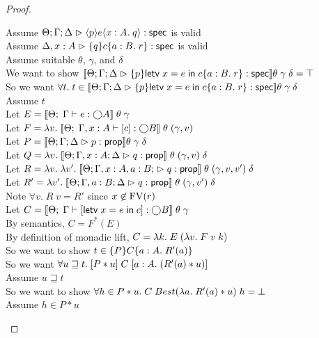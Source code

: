 \begin{proof}
  \begin{tabbedproof}
    \oo Assume $\judgeS{\mspec{p}{e}{x:A}{q}}$ is valid \\
    \oo Assume $\judgeS[\Delta,x:A]{\spec{q}{c}{a:B}{r}}$ is valid\\
    \ooo Assume suitable $\theta$, $\gamma$, and $\delta$ \\
    \oooo We want to show $\interp{\judgeS{\spec{p}{\letv{x}{e}{c}}{a:B}{r}}}\theta\;\gamma\;\delta = \top$\\
    \oooo So we want $\forall t.\; t \in \interp{\judgeS{\spec{p}{\letv{x}{e}{c}}{a:B}{r}}}\theta\;\gamma\;\delta$ \\
    \oooo Assume $t$ \\
    \ooooo Let $E = \interp{\judgeE{\Gamma}{e}{\monad{A}}}\;\theta\;\gamma$ \\
    \ooooo Let $F = \semfun{v}{\interp{\judgeE{\Gamma,x:A}{\comp{c}}{\monad{B}}}\;\theta\;(\gamma,v)}$ \\
    \ooooo Let $P = \interp{\judgeA{p}{\assert}}\theta\;\gamma\;\delta$ \\
    \ooooo Let $Q = \semfun{v}{\interp{\judgeA[\Theta; \Gamma ,x:A;\Delta]{q}{\assert}}\;\theta\;(\gamma,v)\;\delta}$ \\
    \ooooo Let $R = \semfun{v}{\semfun{v'}{\interp{\judgeA[\Theta;\Gamma,x:A,a:B;]{q}{\assert}}\;\theta\;(\gamma, v, v')\;\delta}}$ \\
    \ooooo Let $R' = \semfun{v'}{\interp{\judgeA[\Theta; \Gamma, a:B; \Delta]{q}{\assert}}\;\theta\;(\gamma, v')\;\delta}$ \\
    \ooooo Note $\forall v.\; R\;v = R'$ since $x \not\in \FV{r}$ \\
    \ooooo Let $C = \interp{\judgeE{\Gamma}{\comp{\letv{x}{e}{c}}}{\monad{B}}}\;\theta\;\gamma$ \\
    \ooooo By semantics, $C = F^*(E)$ \\
    \ooooo By definition of monadic lift, $C = \semfun{k}{E\;(\semfun{v}{F\;v\;k})}$ \\
    \ooooo So we want to show $t \in \spec{P}{C}{a:A}{R'(a)}$ \\
    \ooooo So we want $\forall u \sqsupseteq t.\; \basicspec{P * u}{C}{a:A}{(R'(a) * u)}$ \\
    \ooooo Assume $u \sqsupseteq t$ \\
    \oooooo So we want to show $\forall h \in P * u.\; C\;Best(\semfun{a}{R'(a) * u})\;h = \bot$\\
    \oooooo Assume $h \in P * u$ \\

\end{tabbedproof}
\end{proof}
